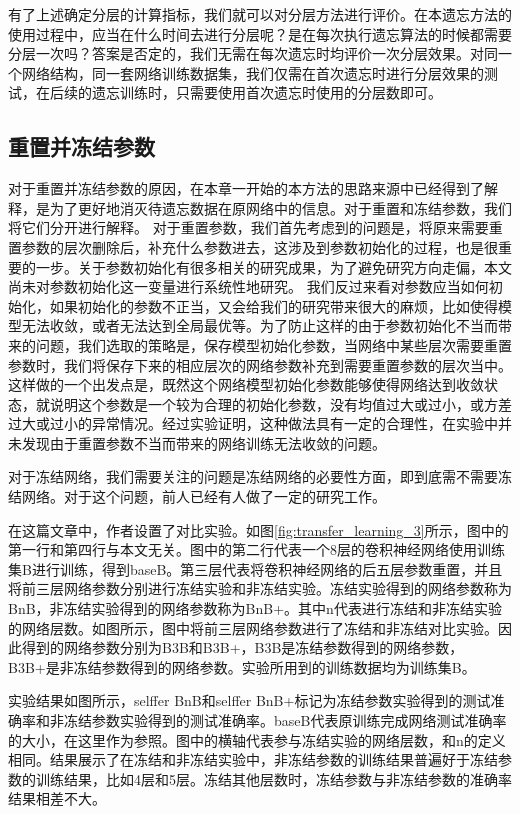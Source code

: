 有了上述确定分层的计算指标，我们就可以对分层方法进行评价。在本遗忘方法的使用过程中，应当在什么时间去进行分层呢？是在每次执行遗忘算法的时候都需要分层一次吗？答案是否定的，我们无需在每次遗忘时均评价一次分层效果。对同一个网络结构，同一套网络训练数据集，我们仅需在首次遗忘时进行分层效果的测试，在后续的遗忘训练时，只需要使用首次遗忘时使用的分层数即可。

\subsection{重置并冻结参数}

对于重置并冻结参数的原因，在本章一开始的本方法的思路来源中已经得到了解释，是为了更好地消灭待遗忘数据在原网络中的信息。对于重置和冻结参数，我们将它们分开进行解释。
对于重置参数，我们首先考虑到的问题是，将原来需要重置参数的层次删除后，补充什么参数进去，这涉及到参数初始化的过程，也是很重要的一步。关于参数初始化有很多相关的研究成果，为了避免研究方向走偏，本文尚未对参数初始化这一变量进行系统性地研究。
我们反过来看对参数应当如何初始化，如果初始化的参数不正当，又会给我们的研究带来很大的麻烦，比如使得模型无法收敛，或者无法达到全局最优等。为了防止这样的由于参数初始化不当而带来的问题，我们选取的策略是，保存模型初始化参数，当网络中某些层次需要重置参数时，我们将保存下来的相应层次的网络参数补充到需要重置参数的层次当中。这样做的一个出发点是，既然这个网络模型初始化参数能够使得网络达到收敛状态，就说明这个参数是一个较为合理的初始化参数，没有均值过大或过小，或方差过大或过小的异常情况。经过实验证明，这种做法具有一定的合理性，在实验中并未发现由于重置参数不当而带来的网络训练无法收敛的问题。

对于冻结网络，我们需要关注的问题是冻结网络的必要性方面，即到底需不需要冻结网络。对于这个问题，前人已经有人做了一定的研究工作。

在这篇文章\cite{yosinski_2014_NIPS}中，作者设置了对比实验。如图\ref{fig:transfer_learning_3}所示，图中的第一行和第四行与本文无关。图中的第二行代表一个8层的卷积神经网络使用训练集B进行训练，得到baseB。第三层代表将卷积神经网络的后五层参数重置，并且将前三层网络参数分别进行冻结实验和非冻结实验。冻结实验得到的网络参数称为BnB，非冻结实验得到的网络参数称为BnB+。其中n代表进行冻结和非冻结实验的网络层数。如图所示，图中将前三层网络参数进行了冻结和非冻结对比实验。因此得到的网络参数分别为B3B和B3B+，B3B是冻结参数得到的网络参数，B3B+是非冻结参数得到的网络参数。实验所用到的训练数据均为训练集B。

实验结果如图所示，selffer BnB和selffer BnB+标记为冻结参数实验得到的测试准确率和非冻结参数实验得到的测试准确率。baseB代表原训练完成网络测试准确率的大小，在这里作为参照。图中的横轴代表参与冻结实验的网络层数，和n的定义相同。结果展示了在冻结和非冻结实验中，非冻结参数的训练结果普遍好于冻结参数的训练结果，比如4层和5层。冻结其他层数时，冻结参数与非冻结参数的准确率结果相差不大。

